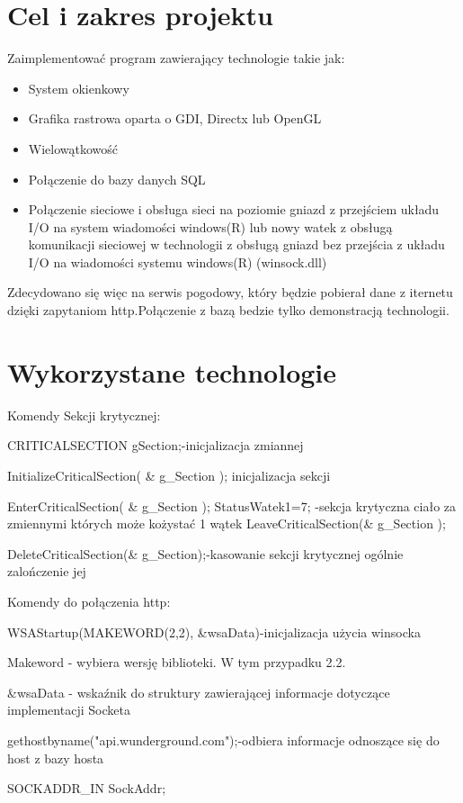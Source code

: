 \documentclass[a4paper,twoside,12pt]{mgr}
\begin{document}
\stronaTytulowa

\tableofcontents
\chapter{Cel i zakres projektu}
Zaimplementować program zawierający technologie takie jak:
\begin{itemize}
\item System okienkowy
\item Grafika rastrowa oparta o GDI, Directx lub OpenGL
\item Wielowątkowość
\item Połączenie do bazy danych SQL
\item Połączenie sieciowe i obsługa sieci na poziomie gniazd z przejściem układu I/O na system wiadomości  windows(R) lub nowy watek z obsługą komunikacji sieciowej w technologii z obsługą gniazd bez przejścia z układu I/O na wiadomości systemu windows(R) (winsock.dll)  
\end{itemize}
Zdecydowano się więc na serwis pogodowy, który będzie pobierał dane z iternetu dzięki zapytaniom http.Połączenie z bazą bedzie tylko demonstracją technologii.


\chapter{Wykorzystane technologie}
Komendy Sekcji krytycznej:

CRITICALSECTION gSection;-inicjalizacja zmiannej

InitializeCriticalSection( \& g\_Section ); inicjalizacja sekcji

EnterCriticalSection( \& g\_Section ); 
	 	StatusWatek1=7;		-sekcja krytyczna ciało za zmiennymi których może kożystać 1 wątek
LeaveCriticalSection(\& g\_Section );

DeleteCriticalSection(\& g\_Section);-kasowanie sekcji krytycznej ogólnie zalończenie jej

Komendy do połączenia http:

WSAStartup(MAKEWORD(2,2), \&wsaData)-inicjalizacja użycia winsocka 

Makeword - wybiera wersję biblioteki. W tym przypadku 2.2.

\&wsaData - wskaźnik do struktury zawierającej informacje dotyczące implementacji Socketa

 gethostbyname("api.wunderground.com");-odbiera informacje odnoszące się do host z bazy hosta
 
 SOCKADDR\_IN SockAddr;
 
\end{document}
